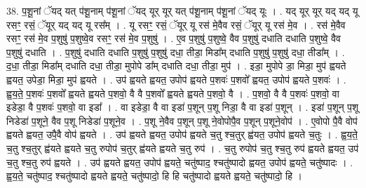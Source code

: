 \documentclass[17pt]{extarticle}
\begin{document}
38. प॒शू॒नां ॅयद् यत् प॑शू॒नाम् प॑शू॒नां ॅयद् यूर् यूर् यत् प॑शू॒नाम् प॑शू॒नां ॅयद् यूः । . यद् यूर् यूर् यद् यद् यू रसꣳ॒॒ रसं॒ ॅयूर् यद् यद् यू रस᳚म् । . यू रसꣳ॒॒ रसं॒ ॅयूर् यू रस॑ मे॒वैव रसं॒ ॅयूर् यू रस॑ मे॒व । . रस॑ मे॒वैव रसꣳ॒॒ रस॑ मे॒व प॒शुषु॑ प॒शुष्वे॒व रसꣳ॒॒ रस॑ मे॒व प॒शुषु॑ । . ए॒व प॒शुषु॑ प॒शुष्वे॒ वैव प॒शुषु॑ दधाति दधाति प॒शुष्वे॒ वैव प॒शुषु॑ दधाति । . प॒शुषु॑ दधाति दधाति प॒शुषु॑ प॒शुषु॑ दधा॒ तीडा॒ मिडा᳚म् दधाति प॒शुषु॑ प॒शुषु॑ दधा॒ तीडा᳚म् । . द॒धा॒ तीडा॒ मिडा᳚म् दधाति दधा॒ तीडा॒ मुपोपे डा᳚म् दधाति दधा॒ तीडा॒ मुप॑ । . इडा॒ मुपोपे डा॒ मिडा॒ मुप॑ ह्वयते ह्वयत॒ उपेडा॒ मिडा॒ मुप॑ ह्वयते । . उप॑ ह्वयते ह्वयत॒ उपोप॑ ह्वयते प॒शवः॑ प॒शवो᳚ ह्वयत॒ उपोप॑ ह्वयते प॒शवः॑ । . ह्व॒य॒ते॒ प॒शवः॑ प॒शवो᳚ ह्वयते ह्वयते प॒शवो॒ वै वै प॒शवो᳚ ह्वयते ह्वयते प॒शवो॒ वै । . प॒शवो॒ वै वै प॒शवः॑ प॒शवो॒ वा इडेडा॒ वै प॒शवः॑ प॒शवो॒ वा इडा᳚ । . वा इडेडा॒ वै वा इडा॑ प॒शून् प॒शू निडा॒ वै वा इडा॑ प॒शून् । . इडा॑ प॒शून् प॒शू निडेडा॑ प॒शूने॒ वैव प॒शू निडेडा॑ प॒शूने॒व । . प॒शू ने॒वैव प॒शून् प॒शू ने॒वोपोपै॒व प॒शून् प॒शूने॒वोप॑ । . ए॒वोपो पै॒वै वोप॑ ह्वयते ह्वयत॒ उपै॒वै वोप॑ ह्वयते । . उप॑ ह्वयते ह्वयत॒ उपोप॑ ह्वयते च॒तु श्च॒तुर् ह्व॑यत॒ उपोप॑ ह्वयते च॒तुः । . ह्व॒य॒ते॒ च॒तु श्च॒तुर् ह्व॑यते ह्वयते च॒तु रुपोप॑ च॒तुर् ह्व॑यते ह्वयते च॒तु रुप॑ । . च॒तु रुपोप॑ च॒तु श्च॒तु रुप॑ ह्वयते ह्वयत॒ उप॑ च॒तु श्च॒तु रुप॑ ह्वयते । . उप॑ ह्वयते ह्वयत॒ उपोप॑ ह्वयते॒ चतु॑ष्पाद॒ श्चतु॑ष्पादो ह्वयत॒ उपोप॑ ह्वयते॒ चतु॑ष्पादः । . ह्व॒य॒ते॒ चतु॑ष्पाद॒ श्चतु॑ष्पादो ह्वयते ह्वयते॒ चतु॑ष्पादो॒ हि हि चतु॑ष्पादो ह्वयते ह्वयते॒ चतु॑ष्पादो॒ हि । \newline
\pagebreak
{}
\end{document}
